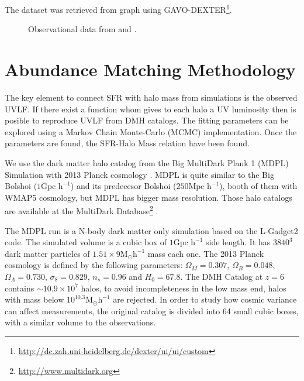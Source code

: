 \documentclass{emulateapj}
\begin{document}
The dataset was retrieved from \cite{mclure09} graph using
GAVO-DEXTER\footnote{\url{http://dc.zah.uni-heidelberg.de/dexter/ui/ui/custom}}.




\begin{figure}
\caption{Observational data from \cite{bouwens14,mclure09}and \cite{willott13}.}
\label{graph_observational_data}
\end{figure}


\section{Abundance Matching Methodology}
\label{sec:methodology}

The key element to connect SFR with halo mass from simulations is the observed UVLF. 
If there exist a function whom gives to each halo a UV luminosity then is posible to 
reproduce UVLF from DMH catalogs. The fitting parameters can be explored using a 
Markov Chain Monte-Carlo (MCMC) implementation. Once the parameters are found, 
the SFR-Halo Mass relation have been found.

We use the dark matter halo catalog from the Big MultiDark Plank 1 (MDPL) Simulation 
\citep{klypin14} with 2013 Planck cosmology \citep{planck1}. MDPL is quite similar to the 
Big Bolshoi ($1 \textrm{Gpc h}^{-1}$) \citep{prada12} and 
its predecesor Bolshoi \citep{klypin11} ($250 \textrm{Mpc h}^{-1}$), booth of them with 
WMAP5 cosmology, but MDPL has bigger mass resolution.  Those halo catalogs are 
available at the MultiDark Database\footnote{\url{http://www.multidark.org}} 
\citep{riebe13}.

The MDPL run is a N-body dark matter only simulation based on the L-Gadget2 
code. The simulated volume is a cubic box of $1 \textrm{Gpc h}^{-1}$ side length. 
It has $3840^3$ dark matter particles of  $1.51\times 9
\textrm{M}_{\odot} \textrm{h}^{-1}$ mass each one. The 2013 Planck
cosmology is defined by the following parameters: $\Omega_M = 0.307$,
$\Omega_B = 0.048$, $\Omega_\Lambda = 0.730$, $\sigma_8 = 0.829$, $n_s
= 0.96$ and  $H_0 = 67.8$. The DMH Catalog at $z=6$ contains $\sim
10.9 \times 10^7$   halos, to avoid incompleteness in the low mass
end, halos with mass below   $10^{10.3} \textrm{M}_{\odot}
\textrm{h}^{-1}$ are rejected. In order to study how  
cosmic variance can affect measurements, the original catalog is
divided into 64 small   cubic boxes, with a similar volume to the
observations. 
\end{document}
